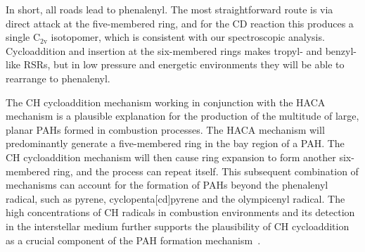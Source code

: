 \documentclass[journal=jacsat,manuscript=article,layout=onecolumn]{achemso}
\begin{document}

In short, all roads lead to phenalenyl. The most straightforward route is via direct attack at the five-membered ring, and for the CD reaction this produces a single C$_{2\mathrm{v}}$ isotopomer, which is consistent with our spectroscopic analysis. Cycloaddition and insertion at the six-membered rings makes tropyl- and benzyl-like RSRs, but in low pressure and energetic environments they will be able to rearrange to phenalenyl. %


The CH cycloaddition mechanism working in conjunction with the HACA mechanism is a plausible explanation for the production of the multitude of large, planar PAHs formed in combustion processes. The HACA mechanism will predominantly generate a five-membered ring in the bay region of a PAH. The CH cycloaddition mechanism will then cause ring expansion to form another six-membered ring, and the process can repeat itself. This subsequent combination of mechanisms can account for the formation of PAHs beyond the phenalenyl radical, such as pyrene, cyclopenta[cd]pyrene and the olympicenyl radical. The high concentrations of CH radicals in combustion environments and its detection in the interstellar medium further supports the plausibility of CH cycloaddition as a crucial component of the PAH formation mechanism~\cite{lov11,tin11,zha12,ger10,ada41}.

\end{document}
